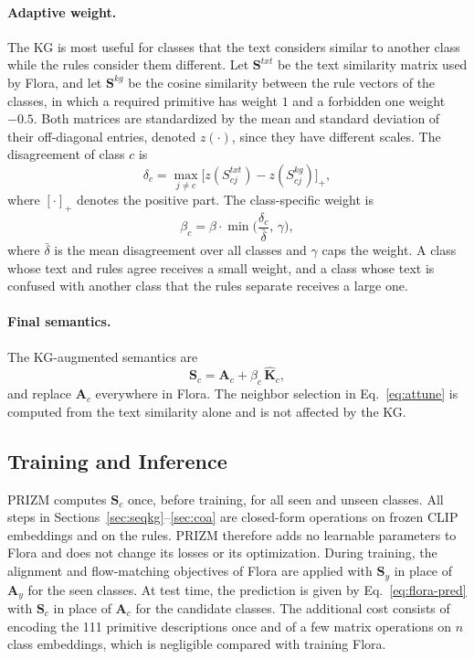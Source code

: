 \documentclass[11pt]{article}
\begin{document}
\paragraph{Adaptive weight.}
The KG is most useful for classes that the text considers similar to another class while the rules consider them different. Let $\mathbf{S}^{txt}$ be the text similarity matrix used by Flora, and let $\mathbf{S}^{kg}$ be the cosine similarity between the rule vectors of the classes, in which a required primitive has weight $1$ and a forbidden one weight $-0.5$. Both matrices are standardized by the mean and standard deviation of their off-diagonal entries, denoted $z(\cdot)$, since they have different scales. The disagreement of class $c$ is
\begin{equation}
  \delta_c = \max_{j \neq c} \big[ z(S^{txt}_{cj}) - z(S^{kg}_{cj}) \big]_+ ,
  \label{eq:disagree}
\end{equation}
where $[\cdot]_+$ denotes the positive part. The class-specific weight is
\begin{equation}
  \beta_c = \beta \cdot \min\!\Big( \frac{\delta_c}{\bar{\delta}},\, \gamma \Big),
  \label{eq:adaptive}
\end{equation}
where $\bar{\delta}$ is the mean disagreement over all classes and $\gamma$ caps the weight. A class whose text and rules agree receives a small weight, and a class whose text is confused with another class that the rules separate receives a large one.

\paragraph{Final semantics.}
The KG-augmented semantics are
\begin{equation}
  \mathbf{S}_c = \mathbf{A}_c + \beta_c\, \hat{\mathbf{K}}_c ,
  \label{eq:final}
\end{equation}
and replace $\mathbf{A}_c$ everywhere in Flora. The neighbor selection in Eq.~\eqref{eq:attune} is computed from the text similarity alone and is not affected by the KG.

\subsection{Training and Inference}
\label{sec:train}

PRIZM computes $\mathbf{S}_c$ once, before training, for all seen and unseen classes. All steps in Sections~\ref{sec:seqkg}--\ref{sec:coa} are closed-form operations on frozen CLIP embeddings and on the rules. PRIZM therefore adds no learnable parameters to Flora and does not change its losses or its optimization. During training, the alignment and flow-matching objectives of Flora are applied with $\mathbf{S}_y$ in place of $\mathbf{A}_y$ for the seen classes. At test time, the prediction is given by Eq.~\eqref{eq:flora-pred} with $\mathbf{S}_c$ in place of $\mathbf{A}_c$ for the candidate classes. The additional cost consists of encoding the 111 primitive descriptions once and of a few matrix operations on $n$ class embeddings, which is negligible compared with training Flora.
\end{document}
